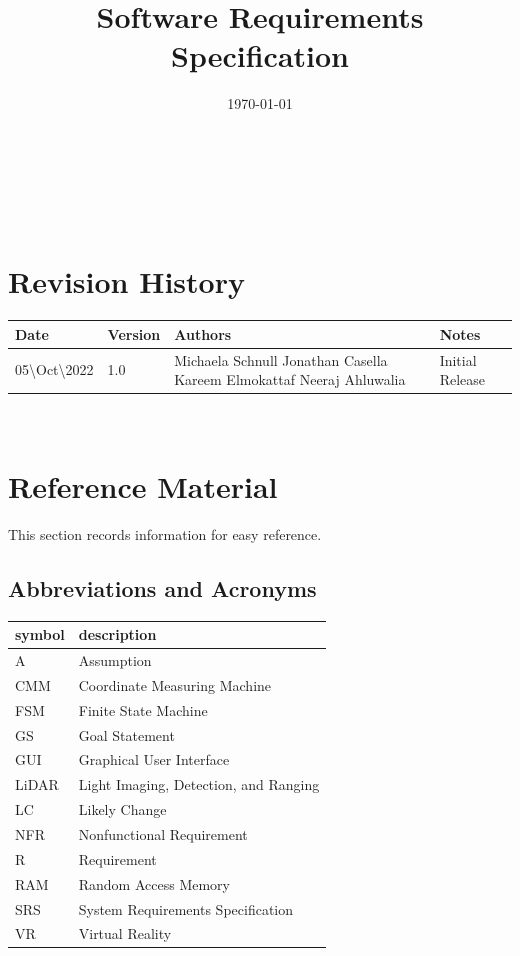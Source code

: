 \documentclass[12pt]{article}
\begin{document}
\title{Software Requirements Specification\\
\progname} 
\author{\authname}
\date{\today}
	
\maketitle

~\newpage


\tableofcontents

~\newpage

\section*{Revision History}

\begin{tabularx}{\textwidth}{p{3cm}p{2cm}p{4cm}X}
\toprule {\bf Date} & {\bf Version} & {\bf Authors} & {\bf Notes}\\
\midrule
05\textbackslash Oct\textbackslash 2022 & 1.0 & Michaela Schnull \newline Jonathan Casella \newline Kareem Elmokattaf \newline Neeraj Ahluwalia & Initial Release\\
\bottomrule
\end{tabularx}

~\newpage

\section{Reference Material}

This section records information for easy reference.

\subsection{Abbreviations and Acronyms}

\renewcommand{\arraystretch}{1.2}
\begin{tabular}{l l} 
  \toprule		
  \textbf{symbol} & \textbf{description}\\
  \midrule 
  A & Assumption\\
  CMM & Coordinate Measuring Machine\\
  FSM & Finite State Machine\\
  GS & Goal Statement\\
  GUI & Graphical User Interface\\
  LiDAR & Light Imaging, Detection, and Ranging\\
  LC & Likely Change\\
  NFR & Nonfunctional Requirement\\
  R & Requirement\\
  RAM & Random Access Memory\\
  SRS & System Requirements Specification\\
  VR & Virtual Reality\\
  \bottomrule
\end{tabular}\\
\end{document}
